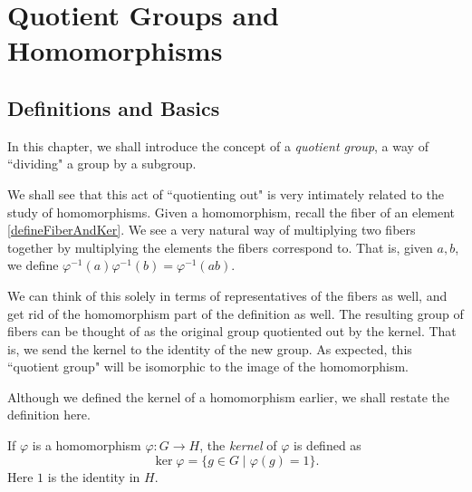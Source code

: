 \section{Quotient Groups and Homomorphisms}

\subsection{Definitions and Basics}
In this chapter, we shall introduce the concept of a \textit{quotient group}, a way of ``dividing" a group by a subgroup.

We shall see that this act of ``quotienting out" is very intimately related to the study of homomorphisms. Given a homomorphism, recall the fiber of an element \ref{defineFiberAndKer}. We see a very natural way of multiplying two fibers together by multiplying the elements the fibers correspond to. That is, given $a,b$, we define $\varphi^{-1}(a)\varphi^{-1}(b)=\varphi^{-1}(ab)$.

We can think of this solely in terms of representatives of the fibers as well, and get rid of the homomorphism part of the definition as well. The resulting group of fibers can be thought of as the original group quotiented out by the kernel. That is, we send the kernel to the identity of the new group. As expected, this ``quotient group" will be isomorphic to the image of the homomorphism.

\vspace{2mm}
Although we defined the kernel of a homomorphism earlier, we shall restate the definition here.
\begin{definition}
    If $\varphi$ is a homomorphism $\varphi:G\to H$, the \textit{kernel} of $\varphi$ is defined as
    $$\ker\varphi=\{g\in G\mid\varphi(g)=1\}.$$
    Here $1$ is the identity in $H$.
\end{definition}

